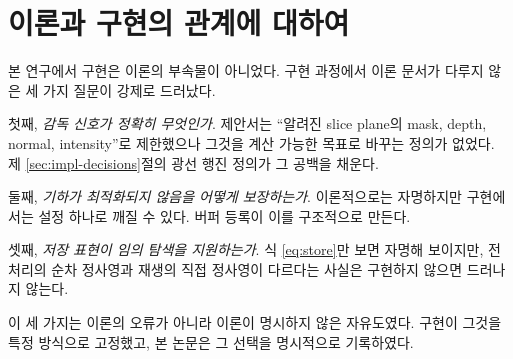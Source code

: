 \section{이론과 구현의 관계에 대하여}

본 연구에서 구현은 이론의 부속물이 아니었다. 구현 과정에서 이론 문서가 다루지 않은
세 가지 질문이 강제로 드러났다.

첫째, \emph{감독 신호가 정확히 무엇인가}. 제안서는 ``알려진 slice plane의 mask, depth,
normal, intensity''로 제한했으나 그것을 계산 가능한 목표로 바꾸는 정의가 없었다.
제 \ref{sec:impl-decisions}절의 광선 행진 정의가 그 공백을 채운다.

둘째, \emph{기하가 최적화되지 않음을 어떻게 보장하는가}. 이론적으로는 자명하지만
구현에서는 설정 하나로 깨질 수 있다. 버퍼 등록이 이를 구조적으로 만든다.

셋째, \emph{저장 표현이 임의 탐색을 지원하는가}. 식 \eqref{eq:store}만 보면 자명해
보이지만, 전처리의 순차 정사영과 재생의 직접 정사영이 다르다는 사실은 구현하지
않으면 드러나지 않는다.

이 세 가지는 이론의 오류가 아니라 이론이 명시하지 않은 자유도였다. 구현이 그것을
특정 방식으로 고정했고, 본 논문은 그 선택을 명시적으로 기록하였다.
